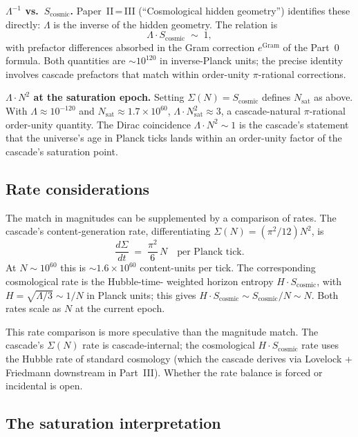 \documentclass[11pt,a4paper]{article}
\begin{document}
\textbf{$\Lambda^{-1}$ vs.\ $S_{\mathrm{cosmic}}$.} Paper~II\,=\,III
(``Cosmological hidden geometry'') identifies these directly: $\Lambda$
is the inverse of the hidden geometry. The relation is
\[
\Lambda \cdot S_{\mathrm{cosmic}} \;\sim\; 1,
\]
with prefactor differences absorbed in the Gram correction
$e^{\mathrm{Gram}}$ of the Part~0 formula. Both quantities are
$\sim 10^{120}$ in inverse-Planck units; the precise identity
involves cascade prefactors that match within order-unity
$\pi$-rational corrections.

\textbf{$\Lambda \cdot N^2$ at the saturation epoch.} Setting
$\Sigma(N) = S_{\mathrm{cosmic}}$ defines $N_{\mathrm{sat}}$ as
above. With $\Lambda \approx 10^{-120}$ and $N_{\mathrm{sat}}
\approx 1.7 \times 10^{60}$,
$\Lambda \cdot N_{\mathrm{sat}}^2 \approx 3$, a cascade-natural
$\pi$-rational order-unity quantity. The Dirac coincidence
$\Lambda \cdot N^2 \sim 1$ is the cascade's statement that the
universe's age in Planck ticks lands within an order-unity factor
of the cascade's saturation point.

\subsection*{Rate considerations}

The match in magnitudes can be supplemented by a comparison of
rates. The cascade's content-generation rate, differentiating
$\Sigma(N) = (\pi^2/12) N^2$, is
\[
\frac{d\Sigma}{dt} \;=\; \frac{\pi^2}{6}\, N \quad\text{per Planck tick.}
\]
At $N \sim 10^{60}$ this is $\sim 1.6 \times 10^{60}$ content-units
per tick. The corresponding cosmological rate is the Hubble-time-
weighted horizon entropy $H \cdot S_{\mathrm{cosmic}}$, with
$H = \sqrt{\Lambda/3} \sim 1/N$ in Planck units; this gives
$H \cdot S_{\mathrm{cosmic}} \sim S_{\mathrm{cosmic}}/N \sim
N$. Both rates scale as $N$ at the current epoch.

This rate comparison is more speculative than the magnitude match.
The cascade's $\Sigma(N)$ rate is cascade-internal; the cosmological
$H \cdot S_{\mathrm{cosmic}}$ rate uses the Hubble rate of standard
cosmology (which the cascade derives via Lovelock + Friedmann
downstream in Part~III). Whether the rate balance is forced or
incidental is open.

\subsection*{The saturation interpretation}
\end{document}
